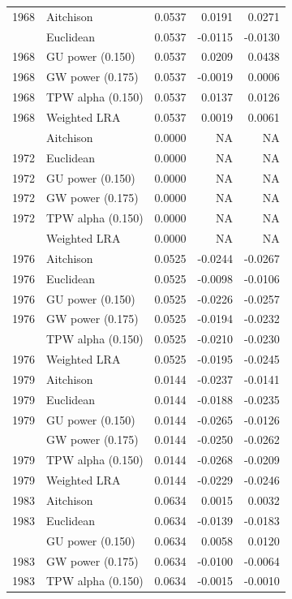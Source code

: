 \begin{longtable}[t]{rlrrr}
1968 & Aitchison & 0.0537 & 0.0191 & 0.0271\\
\addlinespace
1968 & Euclidean & 0.0537 & -0.0115 & -0.0130\\
1968 & GU power (0.150) & 0.0537 & 0.0209 & 0.0438\\
1968 & GW power (0.175) & 0.0537 & -0.0019 & 0.0006\\
1968 & TPW alpha (0.150) & 0.0537 & 0.0137 & 0.0126\\
1968 & Weighted LRA & 0.0537 & 0.0019 & 0.0061\\
\addlinespace
1972 & Aitchison & 0.0000 & NA & NA\\
1972 & Euclidean & 0.0000 & NA & NA\\
1972 & GU power (0.150) & 0.0000 & NA & NA\\
1972 & GW power (0.175) & 0.0000 & NA & NA\\
1972 & TPW alpha (0.150) & 0.0000 & NA & NA\\
\addlinespace
1972 & Weighted LRA & 0.0000 & NA & NA\\
1976 & Aitchison & 0.0525 & -0.0244 & -0.0267\\
1976 & Euclidean & 0.0525 & -0.0098 & -0.0106\\
1976 & GU power (0.150) & 0.0525 & -0.0226 & -0.0257\\
1976 & GW power (0.175) & 0.0525 & -0.0194 & -0.0232\\
\addlinespace
1976 & TPW alpha (0.150) & 0.0525 & -0.0210 & -0.0230\\
1976 & Weighted LRA & 0.0525 & -0.0195 & -0.0245\\
1979 & Aitchison & 0.0144 & -0.0237 & -0.0141\\
1979 & Euclidean & 0.0144 & -0.0188 & -0.0235\\
1979 & GU power (0.150) & 0.0144 & -0.0265 & -0.0126\\
\addlinespace
1979 & GW power (0.175) & 0.0144 & -0.0250 & -0.0262\\
1979 & TPW alpha (0.150) & 0.0144 & -0.0268 & -0.0209\\
1979 & Weighted LRA & 0.0144 & -0.0229 & -0.0246\\
1983 & Aitchison & 0.0634 & 0.0015 & 0.0032\\
1983 & Euclidean & 0.0634 & -0.0139 & -0.0183\\
\addlinespace
1983 & GU power (0.150) & 0.0634 & 0.0058 & 0.0120\\
1983 & GW power (0.175) & 0.0634 & -0.0100 & -0.0064\\
1983 & TPW alpha (0.150) & 0.0634 & -0.0015 & -0.0010\\

\end{longtable}

